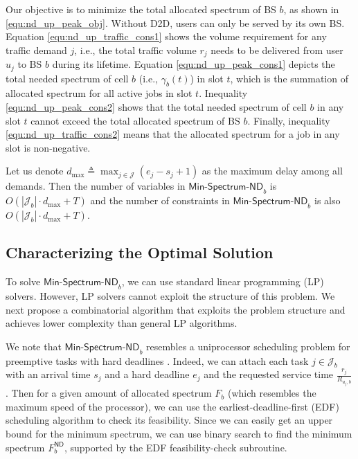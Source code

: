 Our objective is to minimize the total allocated spectrum of BS $b$, as shown in \eqref{equ:nd_up_peak_obj}.
Without D2D, users can only be served by its own BS.
Equation \eqref{equ:nd_up_traffic_cons1} shows the volume requirement for any
traffic demand $j$, i.e., the total traffic volume $r_j$ needs to be delivered from user $u_j$ to BS $b$ during its lifetime.
Equation \eqref{equ:nd_up_peak_cons1} depicts the total needed spectrum of cell $b$ (i.e., $\gamma_b(t)$) in slot $t$,
which is the summation of allocated spectrum for all active jobs in slot $t$.
Inequality \eqref{equ:nd_up_peak_cons2} shows that the total needed spectrum of cell $b$ in any slot $t$
cannot exceed the total allocated spectrum of BS $b$.
Finally, inequality \eqref{equ:nd_up_traffic_cons2} means that the allocated spectrum for a job in any slot is non-negative.



Let us denote $d_{\max} \triangleq \max_{j \in \mathcal{J}} (e_j-s_j+1)$ as
the maximum delay among all demands. Then the number of variables in
$\textsf{Min-Spectrum-ND}_b$ is $O(|\mathcal{J}_b| \cdot d_{\max}+T)$
and the number of constraints in $\textsf{Min-Spectrum-ND}_b$ is also $O(|\mathcal{J}_b| \cdot d_{\max}+T)$.

\subsection{Characterizing the Optimal Solution}
To solve $\textsf{Min-Spectrum-ND}_b$, we can use standard linear programming (LP) solvers.
However, LP solvers cannot exploit the structure of this problem. We next propose a combinatorial algorithm that exploits the problem structure and
achieves lower complexity than general LP algorithms.

We note that $\textsf{Min-Spectrum-ND}_b$ resembles a uniprocessor scheduling problem for preemptive tasks
with hard deadlines \cite{Buttazzo97}. Indeed, we can attach each task $j \in \mathcal{J}_b$ with an
arrival time $s_j$ and a hard deadline $e_j$ and the requested service time
$\frac{r_j}{R_{u_j,b}}$. Then for a given amount of allocated spectrum $F_b$
(which resembles the maximum speed of the processor), we can use
the earliest-deadline-first (EDF) scheduling algorithm  \cite{EDF73} to check its feasibility. Since we
can easily get an upper bound for the minimum spectrum,
we can use binary search to find the minimum spectrum $F_b^{\textsf{ND}}$,
supported by the EDF feasibility-check subroutine.

